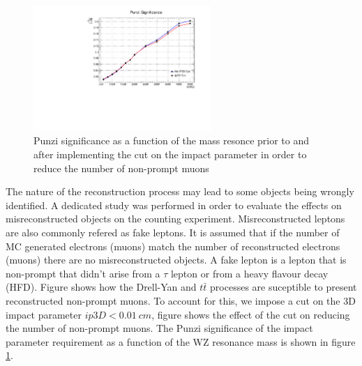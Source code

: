 \begin{figure}[tph]
  \centering
  \includegraphics[width=0.6\textwidth]{fig/PunziTest_Ip3DCut.pdf}
  \caption{Punzi significance as a function of the mass resonce prior to and after implementing
    the cut on the impact parameter in order to reduce the number of non-prompt
    muons}
  \label{fig:Punzi_Ip3DCut}
\end{figure}

The nature of the reconstruction process may lead to some objects being
wrongly identified. A dedicated study was performed in order to evaluate
the effects on misreconstructed objects on the counting experiment.
Misreconstructed leptons are also commonly refered as fake leptons. It
is assumed that if the number of MC generated electrons (muons) match
the number of reconstructed electrons (muons) there are no misreconstructed
objects. A fake lepton is a lepton that is non-prompt that didn't arise from
a $\tau$ lepton or from a heavy flavour decay (HFD). Figure %
shows how the Drell-Yan and $t\bar{t}$ processes are suceptible to present
reconstructed non-prompt muons. To account for this, we impose a cut on the
3D impact parameter $ip3D<0.01~cm$, figure %
shows the effect of the cut on reducing the number of non-prompt muons.
The Punzi significance of the impact parameter requirement as a function
of the WZ resonance mass is shown in figure \ref{fig:Punzi_Ip3DCut}. %


